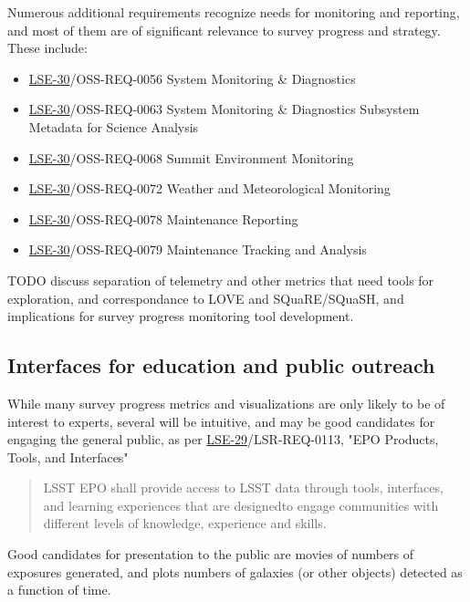 Numerous additional requirements recognize needs for monitoring and reporting, and most of them are of significant relevance to survey progress and strategy. These include:
\begin{itemize}
\item \href{https://ls.st/lse-30}{LSE-30}/OSS-REQ-0056 System Monitoring \& Diagnostics
\item \href{https://ls.st/lse-30}{LSE-30}/OSS-REQ-0063 System Monitoring \& Diagnostics Subsystem Metadata for Science Analysis
\item \href{https://ls.st/lse-30}{LSE-30}/OSS-REQ-0068 Summit Environment Monitoring
\item \href{https://ls.st/lse-30}{LSE-30}/OSS-REQ-0072 Weather and Meteorological Monitoring
\item \href{https://ls.st/lse-30}{LSE-30}/OSS-REQ-0078 Maintenance Reporting
\item \href{https://ls.st/lse-30}{LSE-30}/OSS-REQ-0079 Maintenance Tracking and Analysis
\end{itemize}

TODO discuss separation of telemetry and other metrics that need tools for exploration, and correspondance to LOVE and SQuaRE/SQuaSH, and implications for survey progress monitoring tool development.

\subsection{Interfaces for education and public outreach}
\label{sec:org5577165}
While many survey progress metrics and visualizations are only likely to be of interest to experts, several will be intuitive, and may be good candidates for engaging the general public, as per \href{https://ls.st/lse-29}{LSE-29}/LSR-REQ-0113, "EPO Products, Tools, and Interfaces"
\begin{quote}
LSST EPO shall provide access to LSST data through tools, interfaces,
and learning experiences that are designedto engage communities with
different levels of knowledge, experience and skills.
\end{quote}
Good candidates for presentation to the public are movies of numbers of exposures generated, and plots numbers of galaxies (or other objects) detected as a function of time.

